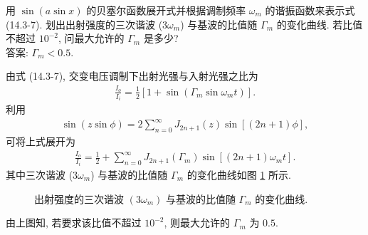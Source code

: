 \documentclass[twoside]{note}
\begin{document}
\begin{exe}
    用 $\sin(a\sin x)$ 的贝塞尔函数展开式并根据调制频率 $\omega_m$ 的谐振函数来表示式 (14.3-7). 划出出射强度的三次谐波 ($3\omega_m$) 与基波的比值随 $\Gamma_m$ 的变化曲线. 若比值不超过 $10^{-2}$, 问最大允许的 $\Gamma_m$ 是多少?\\
    答案: $\Gamma_m<0.5$.
\end{exe}
\begin{sol}
    由式 (14.3-7), 交变电压调制下出射光强与入射光强之比为
    \begin{align}
        \frac{I_o}{I_i}=\frac{1}{2}[1+\sin(\Gamma_m\sin\omega_mt)].
    \end{align}
    利用
    \begin{align}
        \sin(z\sin\phi)=2\sum_{n=0}^{\infty}J_{2n+1}(z)\sin[(2n+1)\phi],
    \end{align}
    可将上式展开为
    \begin{align}
        \frac{I_o}{I_i}=\frac{1}{2}+\sum_{n=0}^{\infty}J_{2n+1}(\Gamma_m)\sin[(2n+1)\omega_mt].
    \end{align}
    其中三次谐波 ($3\omega_m$) 与基波的比值随 $\Gamma_m$ 的变化曲线如图 \ref{14.3} 所示.
    \begin{figure}[H]
        \centering
        \caption{出射强度的三次谐波 $(3\omega_m)$ 与基波的比值随 $\Gamma_m$ 的变化曲线.}
        \label{14.3}
    \end{figure}
    由上图知, 若要求该比值不超过 $10^{-2}$, 则最大允许的 $\Gamma_m$ 为 $0.5$.
\end{sol}
\end{document}
